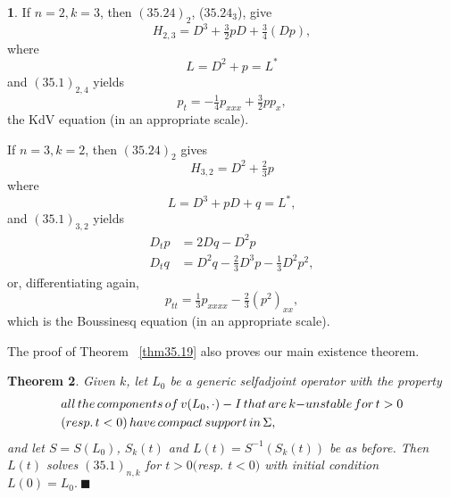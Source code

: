 \documentclass{surv-l}
\theoremstyle{plain}
\newtheorem{theorem}{Theorem}[section]
\theoremstyle{definition}
\newtheorem{remark}[theorem]{\sc{Remark}}
\numberwithin{equation}{chapter}
\begin{document}
\begin{remark}\label{rem35.31}
If $n=2, k=3$, then $(35.24)_{2}$, ($35.24_{3}$), give
\begin{equation*}
H_{2,3}=D^{3}+\tfrac{3}{2}pD+\tfrac{3}{4}(Dp),
\end{equation*}
where
\begin{equation*}
L=D^{2}+p=L^{*}
\end{equation*}
and $(35.1)_{2,4}$ yields
\begin{equation*}
p_{t}=-\tfrac{1}{4}p_{xxx}+\tfrac{3}{2}pp_{x},
\end{equation*}
the KdV equation (in an appropriate scale).
\end{remark}

If $n=3, k=2$, then $(35.24)_{2}$ gives
\begin{equation*}
H_{3,2}=D^{2}+\tfrac{2}{3}p
\end{equation*}
where
\begin{equation*}
L=D^{3}+pD+q=L^{*},
\end{equation*}
and $(35.1)_{3,2}$ yields
\begin{align*}
D_{t}p&=2Dq-D^{2}p\\
D_{t}q&=D^{2}q-\tfrac{2}{3}D^{3}p-\tfrac{1}{3}D^{2}p^{2},
\end{align*}
or, differentiating again,
\begin{equation*}
p_{tt}=\tfrac{1}{3}p_{xxxx}-\tfrac{2}{3}(p^{2})_{xx},
\end{equation*}
which is the Boussinesq equation (in an appropriate scale).

The proof of Theorem ~\ref{thm35.19} also proves our main existence theorem.

\begin{theorem}\label{thm35.31}
Given $k$, let $L_{0}$ be a generic selfadjoint operator with the property
\setcounter{equation}{31}
\begin{align}\label{eq35.32}
&all\, the\, components\, of\, v(L_{0}, \cdot)-I\, that\, are\, k\mathrm{-}unstable\, for\, t>0\\
&(resp.\, t<0)\, have\, compact\, support\, in\, \Sigma,\notag
\end{align}
and let $S=S(L_{0})$, $S_{k}(t)$ and $L(t)=S^{-1}(S_{k}(t))$ be as before. Then $L(t)$ solves $(35.1)_{n,k}$ for $t>0 ($resp. $t<0)$ with initial condition $L(0)=L_{0}.\ \blacksquare$
\end{theorem}
\end{document}

